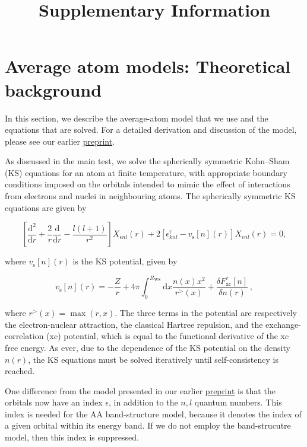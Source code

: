 \documentclass[11pt]{article}
\title{Supplementary Information}
\begin{document}
    
    \maketitle
    
    

    
    \hypertarget{average-atom-models-theoretical-background}{%
\section{Average atom models: Theoretical
background}\label{average-atom-models-theoretical-background}}

In this section, we describe the average-atom model that we use and the
equations that are solved. For a detailed derivation and discussion of
the model, please see our earlier
\href{https://arxiv.org/abs/2103.09928}{preprint}.

As discussed in the main test, we solve the spherically symmetric
Kohn--Sham (KS) equations for an atom at finite temperature, with
appropriate boundary conditions imposed on the orbitals intended to
mimic the effect of interactions from electrons and nuclei in
neighbouring atoms. The spherically symmetric KS equations are given by

\begin{equation}
\left[\frac{\textrm{d}^2}{\textrm{d}r} + \frac{2}{r}\frac{\textrm{d}}{\textrm{d}r} - \frac{l(l+1)}{r^2} \right] X_{\epsilon nl}(r) + 2 \left[\epsilon^{\tau}_{knl} - v_\textrm{s}[n](r) \right] X_{\epsilon nl}(r) = 0,
\end{equation}

where \(v_\textrm{s}[n](r)\) is the KS potential, given by

\begin{equation}
 v_{\textrm{s}}[n](r) = -\frac{Z}{r} + 4\pi \int_0^{R_\textrm{WS}} \textrm{d}{x} \frac{n(x)x^2}{r^>(x)} + \frac{\delta F_\textrm{xc}^\tau [n]}{\delta n(r)}\,,
\end{equation}

where \(r^>(x)=\max(r,x)\). The three terms in the potential are
respectively the electron-nuclear attraction, the classical Hartree
repulsion, and the exchange-correlation (xc) potential, which is equal
to the functional derivative of the xc free energy. As ever, due to the
dependence of the KS potential on the density \(n(r)\), the KS equations
must be solved iteratively until self-consistency is reached.

One difference from the model presented in our earlier
\href{https://arxiv.org/abs/2103.09928}{preprint} is that the orbitals
now have an index \(\epsilon\), in addition to the \(n,l\) quantum
numbers. This index is needed for the AA band-structure model, because
it denotes the index of a given orbital within its energy band. If we do
not employ the band-strucutre model, then this index is suppressed.
\end{document}
